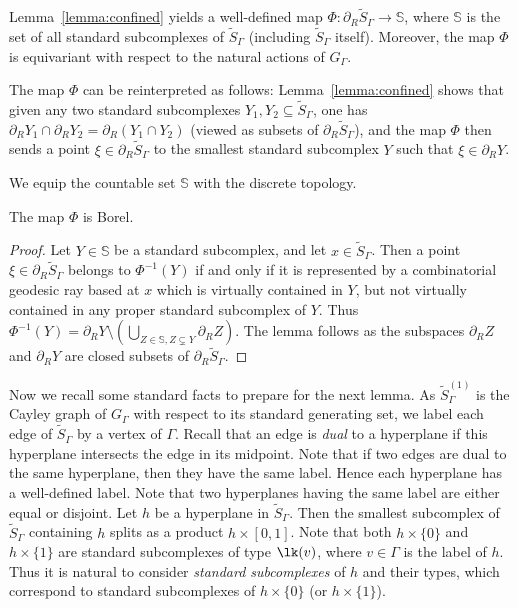 Lemma~\ref{lemma:confined} yields a well-defined map $\Phi:\partial_R \widetilde{S}_\Gamma\to \mathbb{S}$, where $\mathbb{S}$ is the set of all standard subcomplexes of $\widetilde{S}_\Gamma$ (including $\widetilde{S}_\Gamma$ itself). Moreover, the map $\Phi$ is equivariant with respect to the natural actions of $G_\Gamma$.

\begin{rk}
The map $\Phi$ can be reinterpreted as follows: Lemma~\ref{lemma:confined} shows that given any two standard subcomplexes $Y_1,Y_2\subseteq\widetilde{S}_\Gamma$, one has $\partial_R Y_1\cap\partial_R Y_2=\partial_R(Y_1\cap Y_2)$ (viewed as subsets of $\partial_R\widetilde{S}_\Gamma$), and the map $\Phi$ then sends a point $\xi\in\partial_R\widetilde{S}_\Gamma$ to the smallest standard subcomplex $Y$ such that $\xi\in\partial_RY$.
\end{rk}

We equip the countable set $\mathbb{S}$ with the discrete topology.

\begin{lemma}
\label{lem:borel}
The map $\Phi$ is Borel.
\end{lemma}

\begin{proof}
Let $Y\in \mathbb {S}$ be a standard subcomplex, and let $x\in \widetilde{S}_\Gamma$. Then a point $\xi\in\partial_R\widetilde{S}_\Gamma$ belongs to $\Phi^{-1}(Y)$ if and only if it is represented by a combinatorial geodesic ray based at $x$ which is virtually contained in $Y$, but not virtually contained in any proper standard subcomplex of $Y$. Thus $\Phi^{-1}(Y)=\partial_R Y\setminus(\bigcup_{Z\in \mathbb {S}, Z\subsetneq Y}\partial_R Z)$. The lemma follows as the subspaces $\partial_R Z$ and $\partial_R Y$ are closed subsets of $\partial_R \widetilde{S}_\Gamma$.
\end{proof}

Now we recall some standard facts to prepare for the next lemma. As $\widetilde{S}^{(1)}_\Gamma$ is the Cayley graph of $G_\Gamma$ with respect to its standard generating set, we label each edge of $\widetilde{S}_\Gamma$ by a vertex of $\Gamma$. Recall that an edge is \emph{dual} to a hyperplane if this hyperplane intersects the edge in its midpoint. Note that if two edges are dual to the same hyperplane, then they have the same label. Hence each hyperplane has a well-defined label. Note that two hyperplanes having the same label are either equal or disjoint. Let $h$ be a hyperplane in $\widetilde{S}_\Gamma$. Then the smallest subcomplex of $\widetilde{S}_\Gamma$ containing $h$ splits as a product $h\times [0,1]$. Note that both $h\times\{0\}$ and $h\times\{1\}$ are standard subcomplexes of type $\lk(v)$, where $v\in \Gamma$ is the label of $h$. Thus it is natural to consider \emph{standard subcomplexes} of $h$ and their types, which correspond to standard subcomplexes of $h\times\{0\}$ (or $h\times\{1\}$).

